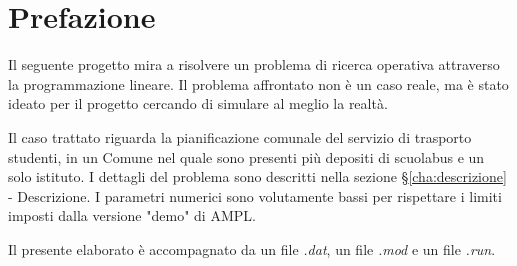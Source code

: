
\chapter{Prefazione}  %

\ifpdf
    \graphicspath{{Chapter1/Figs/Raster/}{Chapter1/Figs/PDF/}{Chapter1/Figs/}}
\else
    \graphicspath{{Chapter1/Figs/Vector/}{Chapter1/Figs/}}
\fi


Il seguente progetto mira a risolvere un problema di ricerca operativa attraverso la programmazione lineare. Il problema affrontato non è un caso reale, ma è stato ideato per il progetto cercando di simulare al meglio la realtà.

Il caso trattato riguarda la pianificazione comunale del servizio di trasporto studenti, in un Comune nel quale sono presenti più depositi di scuolabus e un solo istituto. I dettagli del problema sono descritti nella sezione §\ref{cha:descrizione} - Descrizione. I parametri numerici sono volutamente bassi per rispettare i limiti imposti dalla versione "demo" di AMPL.

Il presente elaborato è accompagnato da un file \textit{.dat}, un file \textit{.mod} e un file \textit{.run}.